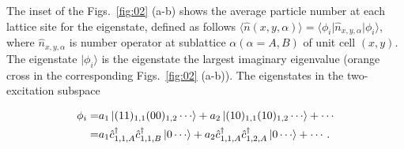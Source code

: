 \documentclass[longbibliography, aps, prx, amsmath, amssymb, amsfonts, twocolumn,superscriptaddress, footinbib]{revtex4-1}
\begin{document}
	The inset of the Figs.~\ref{fig:02} (a-b) shows the average particle number at each lattice site for the eigenstate, defined as follows $\langle \hat{n}(x,y,\alpha) \rangle = \langle \phi_i \vert \hat{n}_{x,y,\alpha} \vert \phi_i \rangle$,
	where 
	$\hat{n}_{x,y,\alpha}$ is number operator at sublattice $\alpha (\alpha=A,B)$ of unit cell $(x,y)$.
	The eigenstate $\vert \phi_i \rangle$ is the eigenstate the largest imaginary eigenvalue (orange cross in the corresponding Figs.~\ref{fig:02} (a-b)). The eigenstates in the two-excitation subspace {\color{blue}{are}
    \begin{small}
    \begin{equation}
		\begin{split}
			\phi_i =& a_1 \ket{(11)_{1,1}(00)_{1,2}\cdots} + a_2 \ket{(10)_{1,1}(10)_{1,2}\cdots} + \cdots\\
			=& a_1 \hat{c}_{1,1,A}^{\dagger}\hat{c}_{1,1,B}^{\dagger} \ket{0\cdots} + a_2 \hat{c}_{1,1,A}^{\dagger}\hat{c}_{1,2,A}^{\dagger} \ket{0\cdots} + \cdots.
		\end{split}\label{eq2}
	\end{equation}
    \end{small}
    }
\end{document}
